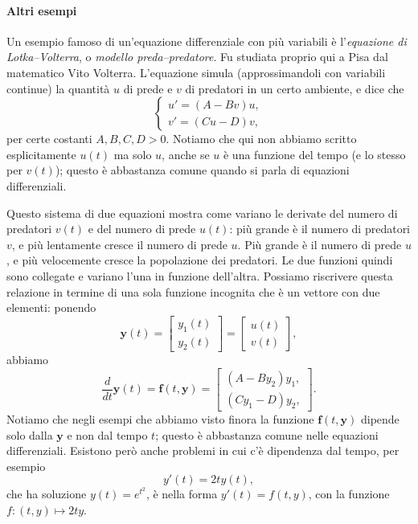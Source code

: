 \documentclass[a4paper]{report}
\theoremstyle{definiton}
\theoremstyle{remark}
\newcommand{\y}{\mathbf{y}}
\newcommand{\f}{\mathbf{f}}
\begin{document}
\paragraph{Altri esempi}
Un esempio famoso di un'equazione differenziale con più variabili è l'\emph{equazione di Lotka--Volterra}, o \emph{modello preda--predatore}. Fu studiata proprio qui a Pisa dal matematico Vito Volterra. L'equazione simula (approssimandoli con variabili continue) la quantità $u$ di prede e $v$ di predatori in un certo ambiente, e dice che
\[
    \begin{cases}
        u' = (A-Bv)u,\\
        v' = (Cu-D)v,
    \end{cases}
\]
per certe costanti $A,B,C,D>0$. Notiamo che qui non abbiamo scritto esplicitamente $u(t)$ ma solo $u$, anche se $u$ è una funzione del tempo (e lo stesso per $v(t)$); questo è abbastanza comune quando si parla di equazioni differenziali.

Questo sistema di due equazioni mostra come variano le derivate del numero di predatori $v(t)$ e del numero di prede $u(t)$: più grande è il numero di predatori $v$, e più lentamente cresce il numero di prede $u$. Più grande è il numero di prede $u$, e più velocemente cresce la popolazione dei predatori. Le due funzioni quindi sono collegate e variano l'una in funzione dell'altra. Possiamo riscrivere questa relazione in termine di una sola funzione incognita che è un vettore con due elementi: ponendo
\[
    \y(t) = 
    \begin{bmatrix}
        y_1(t) \\ 
        y_2(t)
    \end{bmatrix} = 
    \begin{bmatrix}
        u(t)\\
        v(t)
    \end{bmatrix},
\]
abbiamo
\[
    \frac{d}{dt} \y(t) = \f(t,\y) = \begin{bmatrix}
        (A-By_2)y_1,\\
        (Cy_1-D)y_2,
    \end{bmatrix}.
\]
Notiamo che negli esempi che abbiamo visto finora la funzione $\f(t,\y)$ dipende solo dalla $\y$ e non dal tempo $t$; questo è abbastanza comune nelle equazioni differenziali. Esistono però anche problemi in cui c'è dipendenza dal tempo, per esempio
\[
y'(t) = 2 t y(t),
\]
che ha soluzione $y(t) = e^{t^2}$, è nella forma $y'(t) = f(t,y)$, con la funzione $f: (t,y) \mapsto 2ty$.
\end{document}
